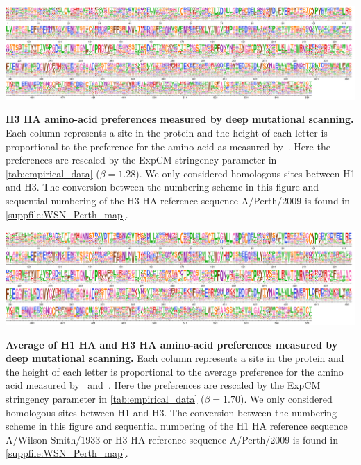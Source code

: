 \documentclass[11pt]{article}
\begin{document}
\begin{suppfig}[H]
\centerline{\includegraphics[width=\textwidth]{figures/prefs_lee}}
\caption{\label{suppfig:prefs_lee}
\textbf{H3 HA amino-acid preferences measured by deep mutational scanning.}
Each column represents a site in the protein and the height of each letter is proportional to the preference for the amino acid as measured by~\citet{lee2018deep}. 
Here the preferences are rescaled by the ExpCM stringency parameter in \ref{tab:empirical_data} ($\beta=1.28$). 
We only considered homologous sites between H1 and H3. 
The conversion between the numbering scheme in this figure and sequential numbering of the H3 HA reference sequence A/Perth/2009 is found in \ref{suppfile:WSN_Perth_map}. 
 }
\end{suppfig}

\begin{suppfig}[H]
\centerline{\includegraphics[width=\textwidth]{figures/prefs_average}}
\caption{\label{suppfig:prefs_average}
\textbf{Average of H1 HA  and H3 HA amino-acid preferences measured by deep mutational scanning.}
Each column represents a site in the protein and the height of each letter is proportional to the average preference for the amino acid measured by~\citet{doud2016accurate} and~\citet{lee2018deep}. 
Here the preferences are rescaled by the ExpCM stringency parameter in \ref{tab:empirical_data} ($\beta=1.70$). 
We only considered homologous sites between H1 and H3. 
The conversion between the numbering scheme in this figure and sequential numbering of the H1 HA reference sequence A/Wilson Smith/1933 or H3 HA reference sequence A/Perth/2009 is found in \ref{suppfile:WSN_Perth_map}. 
}
\end{suppfig}
\end{document}
